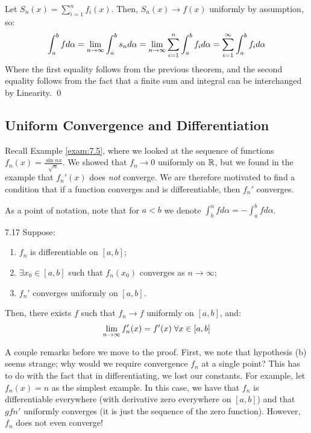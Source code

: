 \begin{nproof}
    Let $S_n(x) = \sum_{i=1}^n f_i(x)$. Then, $S_n(x) \rightarrow f(x)$ uniformly by assumption, so:
    \begin{align*}
        \int_a^b fd\alpha = \lim_{n \rightarrow \infty} \int_a^b s_n d\alpha = \lim_{n \rightarrow \infty} \sum_{i=1}^n \int_a^b f_i d\alpha = \sum_{i=1}^\infty \int_a^b f_i d\alpha
    \end{align*}
    Where the first equality follows from the previous theorem, and the second equality follows from the fact that a finite sum and integral can be interchanged by Linearity. \qed
\end{nproof}

\subsection{Uniform Convergence and Differentiation}
Recall Example \ref{exam:7.5}, where we looked at the sequence of functions $f_n(x) = \frac{\sin n x}{\sqrt{n}}$. We showed that $f_n \rightarrow 0$ uniformly on $\mathbb{R}$, but we found in the example that $f_n'(x)$ does \emph{not} converge. We are therefore motivated to find a condition that if a function converges and is differentiable, then $f_n'$ converges.

As a point of notation, note that for $a < b$ we denote $\int_b^a f d\alpha = -\int_a^b fd\alpha$. 

\begin{theorem}{}{7.17}
    Suppose:
    \begin{enumerate}
        \item $f_n$ is differentiable on $[a, b]$;
        \item $\exists x_0 \in [a, b]$ such that $f_n(x_0)$ converges as $n \rightarrow \infty$;
        \item $f_n'$ converges uniformly on $[a, b]$. 
    \end{enumerate}
    Then, there exists $f$ such that $f_n \rightarrow f$ uniformly on $[a, b]$, and:
    \begin{align*}
        \lim_{n \rightarrow \infty} f_n'(x) = f'(x) \; \forall x \in [a, b]
    \end{align*}
\end{theorem}
\noindent A couple remarks before we move to the proof. First, we note that hypothesis (b) seems strange; why would we require convergence $f_n$ at a single point? This has to do with the fact that in differentiating, we lost our constants. For example, let $f_n(x) = n$ as the simplest example. In this case, we have that $f_n$ is differentiable everywhere (with derivative zero everywhere on $[a, b]$) and that $gfn'$ uniformly converges (it is just the sequence of the zero function). However, $f_n$ does not even converge!


